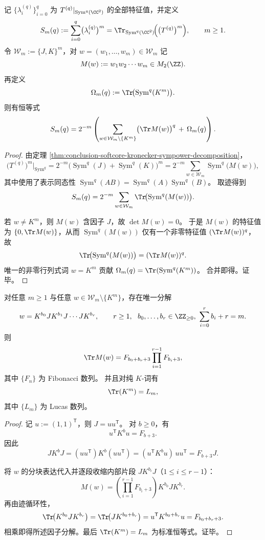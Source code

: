 \begin{theorem}[例外幂和的字迹展开]\label{thm:conclusion-softcore-exceptional-word-trace-expansion}
记 \(\{\lambda_i^{(q)}\}_{i=0}^{q}\) 为
\(
T^{(q)}|_{\operatorname{Sym}^q(\CC^2)}
\)
的全部特征值，并定义
\[
S_m(q):=\sum_{i=0}^{q}\bigl(\lambda_i^{(q)}\bigr)^m
=\Tr_{\operatorname{Sym}^q(\CC^2)}\!\Bigl(\bigl(T^{(q)}\bigr)^m\Bigr),
\qquad m\ge 1.
\]
令 \(\mathcal W_m:=\{J,K\}^m\)，对 \(w=(w_1,\dots,w_m)\in\mathcal W_m\) 记
\[
M(w):=w_1w_2\cdots w_m\in M_2(\ZZ).
\]
再定义
\[
\Omega_m(q):=\Tr\!\bigl(\operatorname{Sym}^q(K^m)\bigr).
\]
则有恒等式
\[
S_m(q)
=2^{-m}\left(
\sum_{w\in\mathcal W_m\setminus\{K^m\}}
\bigl(\Tr M(w)\bigr)^q
\,+\,\Omega_m(q)\right).
\]
\end{theorem}
\begin{proof}
由定理 \ref{thm:conclusion-softcore-kronecker-sympower-decomposition}，
\[
\bigl(T^{(q)}\bigr)^m\big|_{\operatorname{Sym}^q}
=2^{-m}\bigl(\operatorname{Sym}^q(J)+\operatorname{Sym}^q(K)\bigr)^m
=2^{-m}\sum_{w\in\mathcal W_m}\operatorname{Sym}^q\!\bigl(M(w)\bigr),
\]
其中使用了表示同态性
\(
\operatorname{Sym}^q(AB)=\operatorname{Sym}^q(A)\operatorname{Sym}^q(B)
\)。
取迹得到
\[
S_m(q)=2^{-m}\sum_{w\in\mathcal W_m}
\Tr\!\bigl(\operatorname{Sym}^q(M(w))\bigr).
\]

若 \(w\neq K^m\)，则 \(M(w)\) 含因子 \(J\)，故 \(\det M(w)=0\)。
于是 \(M(w)\) 的特征值为 \(\{0,\Tr M(w)\}\)，从而
\(
\operatorname{Sym}^q(M(w))
\)
仅有一个非零特征值 \((\Tr M(w))^q\)，故
\[
\Tr\!\bigl(\operatorname{Sym}^q(M(w))\bigr)=(\Tr M(w))^q.
\]
唯一的非零行列式词 \(w=K^m\) 贡献
\(
\Omega_m(q)=\Tr(\operatorname{Sym}^q(K^m))
\)。
合并即得。证毕。
\end{proof}

\begin{proposition}\label{prop:conclusion-softcore-wordtrace-fibonacci-factorization}
对任意 \(m\ge 1\) 与任意 \(w\in\mathcal W_m\setminus\{K^m\}\)，存在唯一分解
\[
w=K^{b_0}J K^{b_1}J\cdots J K^{b_r},
\qquad
r\ge 1,\ \ b_0,\dots,b_r\in\ZZ_{\ge 0},\
\sum_{i=0}^{r}b_i+r=m.
\]
则
\[
\Tr M(w)=F_{b_0+b_r+3}\prod_{i=1}^{r-1}F_{b_i+3},
\]
其中 \(\{F_n\}\) 为 Fibonacci 数列。
并且对纯 \(K\)-词有
\[
\Tr(K^m)=L_m,
\]
其中 \(\{L_m\}\) 为 Lucas 数列。
\end{proposition}
\begin{proof}
记 \(u:=(1,1)^{\mathsf T}\)，则 \(J=uu^{\mathsf T}\)。
对 \(b\ge 0\)，有
\[
u^{\mathsf T}K^b u=F_{b+3}.
\]
因此
\[
J K^b J
=(uu^{\mathsf T})K^b(uu^{\mathsf T})
=(u^{\mathsf T}K^b u)\,uu^{\mathsf T}
=F_{b+3}J.
\]

将 \(w\) 的分块表达代入并逐段收缩内部片段 \(JK^{b_i}J\)（\(1\le i\le r-1\)）：
\[
M(w)=\left(\prod_{i=1}^{r-1}F_{b_i+3}\right)K^{b_0}JK^{b_r}.
\]
再由迹循环性，
\[
\Tr\!\bigl(K^{b_0}JK^{b_r}\bigr)
=\Tr\!\bigl(JK^{b_0+b_r}\bigr)
=u^{\mathsf T}K^{b_0+b_r}u
=F_{b_0+b_r+3}.
\]
相乘即得所述因子分解。最后 \(\Tr(K^m)=L_m\) 为标准恒等式。证毕。
\end{proof}

